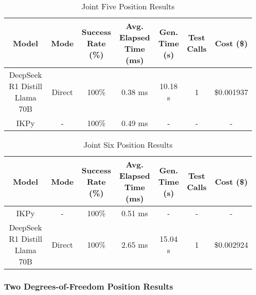 \begin{landscape}
\begin{table}[H]
\tiny
\renewcommand{\arraystretch}{1.2}
\caption{Joint Five Position Results}
\begin{center}
\begin{tabular}{|c|c|c|c|c|c|c|}
    \hline
    \textbf{Model} & 
    \textbf{Mode} & 
    \makecell{\textbf{Success}\\\textbf{Rate (\%)}} &
    \makecell{\textbf{Avg. Elapsed}\\\textbf{Time (ms)}} &
    \makecell{\textbf{Gen.}\\\textbf{Time (s)}} &
    \makecell{\textbf{Test}\\\textbf{Calls}} &
    \textbf{Cost (\$)} \\
    \hline
    DeepSeek R1 Distill Llama 70B & Direct & 100\% & 0.38 ms & 10.18 s & 1 & \$0.001937 \\
    \hline
    IKPy & - & 100\% & 0.49 ms & - & - & - \\
    \hline
\end{tabular}
\label{Results-Position-5-5}
\end{center}
\end{table}

\begin{table}[H]
\tiny
\renewcommand{\arraystretch}{1.2}
\caption{Joint Six Position Results}
\begin{center}
\begin{tabular}{|c|c|c|c|c|c|c|}
    \hline
    \textbf{Model} & 
    \textbf{Mode} & 
    \makecell{\textbf{Success}\\\textbf{Rate (\%)}} &
    \makecell{\textbf{Avg. Elapsed}\\\textbf{Time (ms)}} &
    \makecell{\textbf{Gen.}\\\textbf{Time (s)}} &
    \makecell{\textbf{Test}\\\textbf{Calls}} &
    \textbf{Cost (\$)} \\
    \hline
    IKPy & - & 100\% & 0.51 ms & - & - & - \\
    \hline
    DeepSeek R1 Distill Llama 70B & Direct & 100\% & 2.65 ms & 15.04 s & 1 & \$0.002924 \\
    \hline
\end{tabular}
\label{Results-Position-6-6}
\end{center}
\end{table}

\subsubsection{Two Degrees-of-Freedom Position Results}


\end{landscape}
